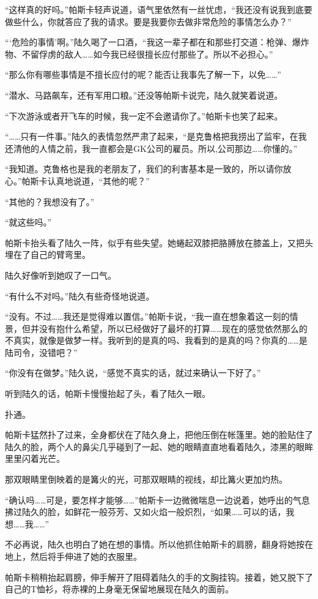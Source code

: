 “这样真的好吗。”帕斯卡轻声说道，语气里依然有一丝忧虑，“我还没有说我到底要做些什么，你就答应了我的请求。要是我要你去做非常危险的事情怎么办？”

“‘危险的事情’啊。”陆久喝了一口酒，“我这一辈子都在和那些打交道：枪弹、爆炸物、不留俘虏的敌人……如今我已经很擅长应付那些了。所以不必担心。”

“那么你有哪些事情是不擅长应付的呢？能否让我事先了解一下，以免……”

“潜水、马路飙车，还有军用口粮。”还没等帕斯卡说完，陆久就笑着说道。

“下次游泳或者开飞车的时候，我一定不会邀请你了。”帕斯卡也笑了起来。

“……只有一件事。”陆久的表情忽然严肃了起来，“是克鲁格把我捞出了监牢，在我还清他的人情之前，我一直都会是GK公司的雇员。所以,公司那边……你懂的。”

“我知道。克鲁格也是我的老朋友了，我们的利害基本是一致的，所以请你放心。”帕斯卡认真地说道，“其他的呢？”

“其他的？我想没有了。”

“就这些吗。”

帕斯卡抬头看了陆久一阵，似乎有些失望。她蜷起双膝把胳膊放在膝盖上，又把头埋在了自己的臂弯里。

陆久好像听到她叹了一口气。

“有什么不对吗。”陆久有些奇怪地说道。

“没有。不过……我还是觉得难以置信。”帕斯卡说，“我一直在想象着这一刻的情景，但并没有抱什么希望，所以已经做好了最坏的打算……现在的感觉依然那么的不真实，就像是做梦一样。我听到的是真的吗、我看到的是真的吗？你真的……是陆司令，没错吧？”

“你没有在做梦。”陆久说，“感觉不真实的话，就过来确认一下好了。”

听到陆久的话，帕斯卡慢慢抬起了头，看了陆久一眼。

扑通。

帕斯卡猛然扑了过来，全身都伏在了陆久身上，把他压倒在帐篷里。她的脸贴住了陆久的脸，两个人的鼻尖几乎碰到了一起、她的眼睛直直地看着陆久，漆黑的眼眸里里闪着光芒。

那双眼睛里倒映着的是篝火的光，可那双眼睛的视线，却比篝火更加灼热。

“确认吗……可是，要怎样才能够……”帕斯卡一边微微喘息一边说着，她呼出的气息拂过陆久的脸，如鲜花一般芬芳、又如火焰一般炽烈，“如果……可以的话，我想……我……”

不必再说，陆久也明白了她在想的事情。所以他抓住帕斯卡的肩膀，翻身将她按在地上，然后将手伸进了她的衣服里。

帕斯卡稍稍抬起肩膀，伸手解开了阻碍着陆久的手的文胸挂钩。接着，她又脱下了自己的T恤衫，将赤裸的上身毫无保留地展现在陆久的面前。


